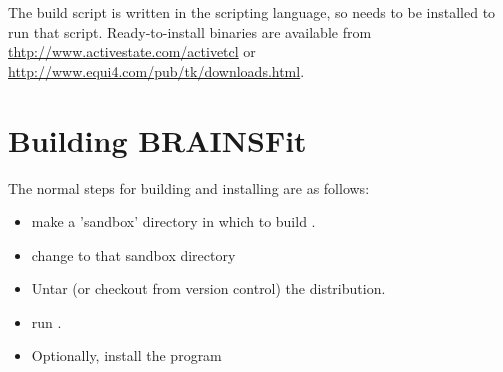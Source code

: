 \documentclass{InsightArticle}
\begin{document}
The build script is written in the  scripting language, so
 needs to be installed to run that script. Ready-to-install
 binaries are available from
\url{thtp://www.activestate.com/activetcl} or \url{http://www.equi4.com/pub/tk/downloads.html}.








\section{Building BRAINSFit}
The normal steps for building and installing \miregprog{} are as follows:

\begin{itemize}
\item make a 'sandbox' directory in which to build \miregprog{}.
\item change to that sandbox directory
\item Untar (or checkout from version control) the \miregprog{} distribution.
\item run .
\item Optionally, install the program
\end{itemize}
\end{document}
